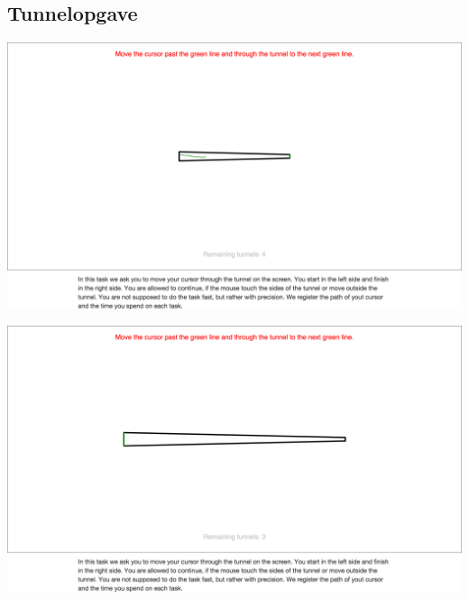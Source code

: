 \subsection*{Tunnelopgave}
\begin{minipage}{\linewidth}
	\begin{minipage}{\textwidth}
		\centering
		\includegraphics[width=\textwidth, trim = .5cm 20cm .5cm 15cm, clip]{images/screenshots/ex_step_4_tunnel_path}
		\label{fig:ex_tunnel_1}
	\end{minipage}
	\begin{minipage}{\textwidth}
		\centering
		\includegraphics[width=\textwidth, trim = .5cm 20cm .5cm 15cm, clip]{images/screenshots/ex_step_4_tunnel_2}
		\label{fig:ex_tunnel_2}
	\end{minipage}
	\begin{minipage}{\textwidth}
		\centering

\end{minipage}
\end{minipage}

